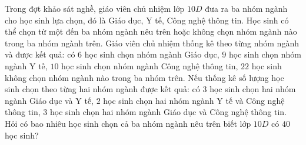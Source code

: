 \begin{bt}%
	Trong đợt khảo sát nghề, giáo viên chủ nhiệm lớp $10D$ đưa ra ba nhóm ngành cho học sinh lựa chọn, đó là Giáo dục, Y tế, Công nghệ thông tin. Học sinh có thể chọn từ một đến ba nhóm ngành nêu trên hoặc không chọn nhóm ngành nào trong ba nhóm ngành trên. Giáo viên chủ nhiệm thống kê theo từng nhóm ngành và được kết quả: có $6$ học sinh chọn nhóm ngành Giáo dục, $9$ học sinh chọn nhóm ngành Y tế, $10$ học sinh chọn nhóm ngành Công nghệ thông tin, $22$ học sinh không chọn nhóm ngành nào trong ba nhóm trên. Nếu thống kê số lượng học sinh chọn theo từng hai nhóm ngành được kết quả:  có $3$ học sinh chọn hai nhóm ngành Giáo dục và Y tế, $2$ học sinh chọn hai nhóm ngành Y tế và Công nghệ thông tin, $3$ học sinh chọn hai nhóm ngành Giáo dục và Công nghệ thông tin. Hỏi có bao nhiêu học sinh chọn cả ba nhóm ngành nêu trên biết lớp $10D$ có $40$ học sinh?
\end{bt}


